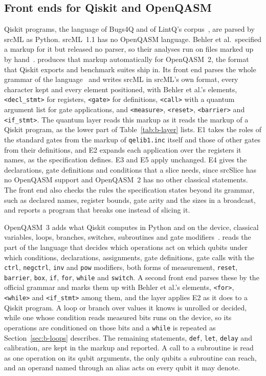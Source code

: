 \subsection{Front ends for Qiskit and OpenQASM}\label{sec:b-frontends}
Qiskit programs, the language of Bugs4Q and of LintQ's corpus~\cite{zhao2023bugs4q, paltenghi2024lintq}, are parsed by
srcML as Python. srcML~1.1 has no OpenQASM language. Behler et al.\ specified a markup for it but released no parser, so
their analyses run on files marked up by hand~\cite{behler2024supporting, behler2025static}. \tool{} produces that markup
automatically for OpenQASM~2, the format that Qiskit exports and benchmark suites ship in. Its front end parses the
whole grammar of the language~\cite{cross2017openqasm} and writes srcML in srcML's own format, every character kept and
every element positioned, with Behler et al.'s elements, \texttt{<decl\_stmt>} for registers, \texttt{<gate>} for
definitions, \texttt{<call>} with a quantum argument list for gate applications, and \texttt{<measure>},
\texttt{<reset>}, \texttt{<barrier>} and \texttt{<if\_stmt>}. The quantum layer reads this markup as it reads the markup
of a Qiskit program, as the lower part of Table~\ref{tab:b-layer} lists. E1 takes the roles of the standard gates from
the markup of \texttt{qelib1.inc} itself and those of other gates from their definitions, and E2 expands each
application over the registers it names, as the specification defines. E3 and E5 apply unchanged. E4 gives the
declarations, gate definitions and conditions that a slice needs, since srcSlice has no OpenQASM support and
OpenQASM~2 has no other classical statements. The front end also checks the rules the specification states beyond its
grammar, such as declared names, register bounds, gate arity and the sizes in a broadcast, and reports a program that
breaks one instead of slicing it.

OpenQASM~3 adds what Qiskit computes in Python and on the device, classical variables, loops, branches, switches,
subroutines and gate modifiers~\cite{cross2022openqasm3}. \tool{} reads the part of the language that decides which
operations act on which qubits under which conditions, declarations, assignments, gate definitions, gate calls with the
\texttt{ctrl}, \texttt{negctrl}, \texttt{inv} and \texttt{pow} modifiers, both forms of measurement, \texttt{reset},
\texttt{barrier}, \texttt{box}, \texttt{if}, \texttt{for}, \texttt{while} and \texttt{switch}. A second front end
parses these by the official grammar and marks them up with Behler et al.'s elements, \texttt{<for>},
\texttt{<while>} and \texttt{<if\_stmt>} among them, and the layer applies E2 as it does to a Qiskit program. A loop or
branch over values it knows is unrolled or decided, while one whose condition reads measured bits runs on the device,
so its operations are conditioned on those bits and a \texttt{while} is repeated as Section~\ref{sec:b-loops}
describes. The remaining statements, \texttt{def}, \texttt{let}, \texttt{delay} and calibration, are kept in the markup
and reported. A call to a subroutine is read as one operation on its qubit arguments, the only qubits a subroutine can
reach, and an operand named through an alias acts on every qubit it may denote.

